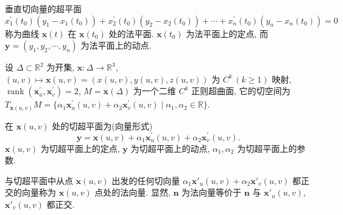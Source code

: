 垂直切向量的超平面
\[
  x_{1}^{\prime}(t_{0})(y_{1} - x_{1}(t_{0})) + x_{2}^{\prime}(t_{0})(y_{2} - x_{2}(t_{0})) + \cdots + x_{n}^{\prime}(t_{0})(y_{n} - x_{n}(t_{0})) = 0
\]
称为曲线 $\boldsymbol{x}(t)$ 在 $\boldsymbol{x}(t_{0})$ 处的法平面. $\boldsymbol{x}(t_{0})$ 为法平面上的定点, 而 $\boldsymbol{y} = (y_{1}, y_{2}, \cdots, y_{n})$ 为法平面上的动点.

\begin{example}\label{ex:9.1.2}
设 $\Delta \subset \mathbb{R}^{2}$ 为开集, $\boldsymbol{x}\colon \Delta \to \mathbb{R}^{3}$, $(u, v) \mapsto \boldsymbol{x}(u, v) = (x(u, v), y(u, v), z(u, v))$ 为 $C^{k}\,(k \geqslant 1)$ 映射, $\operatorname{rank}(\boldsymbol{x}_{u}^{\prime}, \boldsymbol{x}_{v}^{\prime}) = 2$, $M = \boldsymbol{x}(\Delta)$ 为一个二维 $C^{k}$ 正则超曲面, 它的切空间为 $T_{\boldsymbol{x}(u,v)} M = \{\alpha_{1} \boldsymbol{x}_{u}^{\prime}(u, v) + \alpha_{2} \boldsymbol{x}_{v}^{\prime}(u, v) \mid \alpha_{1}, \alpha_{2} \in \mathbb{R}\}$.

在 $\boldsymbol{x}(u,v)$ 处的切超平面为(向量形式)
\[
  \boldsymbol{y} = \boldsymbol{x}(u,v) + \alpha_{1}\boldsymbol{x}_{u}^{\prime}(u,v) + \alpha_{2}\boldsymbol{x}_{v}^{\prime}(u,v).
\]
$\boldsymbol{x}(u,v)$ 为切超平面上的定点, $\boldsymbol{y}$ 为切超平面上的动点, $\alpha_{1}, \alpha_{2}$ 为切超平面上的参数.

与切超平面中从点 $\boldsymbol{x}(u,v)$ 出发的任何切向量 $\alpha_{1}\boldsymbol{x}'_{u}(u,v) + \alpha_{2}\boldsymbol{x}'_{v}(u,v)$ 都正交的向量称为 $\boldsymbol{x}(u,v)$ 点处的法向量. 显然, $\boldsymbol{n}$ 为法向量等价于 $\boldsymbol{n}$ 与 $\boldsymbol{x}'_{u}(u,v)$, $\boldsymbol{x}'_{v}(u,v)$ 都正交.


\end{example}
